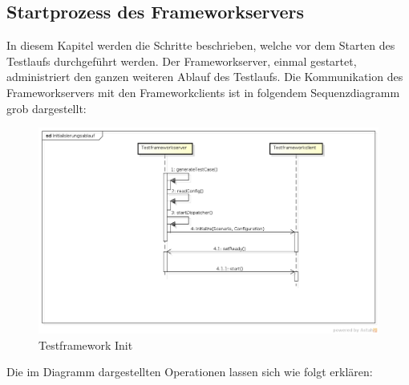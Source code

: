 \subsection{Startprozess des Frameworkservers}
\label{sec:startFramework}
In diesem Kapitel werden die Schritte beschrieben, welche vor dem Starten des Testlaufs durchgeführt werden. Der Frameworkserver, einmal gestartet, administriert den ganzen weiteren Ablauf des Testlaufs. \newline
Die Kommunikation des Frameworkservers mit den Frameworkclients ist in folgendem Sequenzdiagramm grob dargestellt:


\begin{figure}[H]
\begin{center}
\includegraphics[scale=0.3]{image_testFramework/TestFWInit.png}
\end{center}
\caption{Testframework Init}
\end{figure}

Die im Diagramm dargestellten Operationen lassen sich wie folgt erklären:

